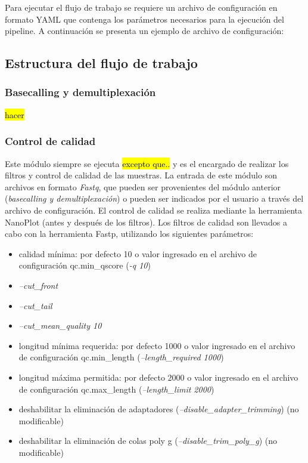 Para ejecutar el flujo de trabajo se requiere un archivo de configuración en formato YAML que contenga los parámetros necesarios para la ejecución del pipeline. 
A continuación se presenta un ejemplo de archivo de configuración:



\subsection{Estructura del flujo de trabajo}
\subsubsection{Basecalling y demultiplexación}
\hl{hacer}
\subsubsection{Control de calidad}
Este módulo siempre se ejecuta  \hl{excepto que..} y es el encargado de realizar los filtros y control de calidad de las muestras.
La entrada de este módulo son archivos en formato \textit{Fastq}, que pueden ser provenientes del módulo anterior (\textit{basecalling y demultiplexación}) o pueden ser indicados por el usuario a través del archivo de configuración.
El control de calidad se realiza mediante la herramienta NanoPlot (antes y después de los filtros).
Los filtros de calidad son llevados a cabo con la herramienta Fastp, utilizando los siguientes parámetros:
\begin{itemize}
    \item calidad mínima: por defecto 10 o valor ingresado en el archivo de configuración qc.min\_qscore (\textit{-q 10})
    \item \textit{--cut\_front} 
    \item \textit{--cut\_tail} 
    \item \textit{--cut\_mean\_quality 10} 
    \item longitud mínima requerida: por defecto 1000 o valor ingresado en el archivo de configuración qc.min\_length (\textit{--length\_required 1000}) 
    \item longitud máxima permitida: por defecto 2000 o valor ingresado en el archivo de configuración qc.max\_length (\textit{--length\_limit 2000})
    \item deshabilitar la eliminación de adaptadores (\textit{--disable\_adapter\_trimming}) (no modificable)
    \item deshabilitar la eliminación de colas poly g (\textit{--disable\_trim\_poly\_g}) (no modificable)
\end{itemize}

